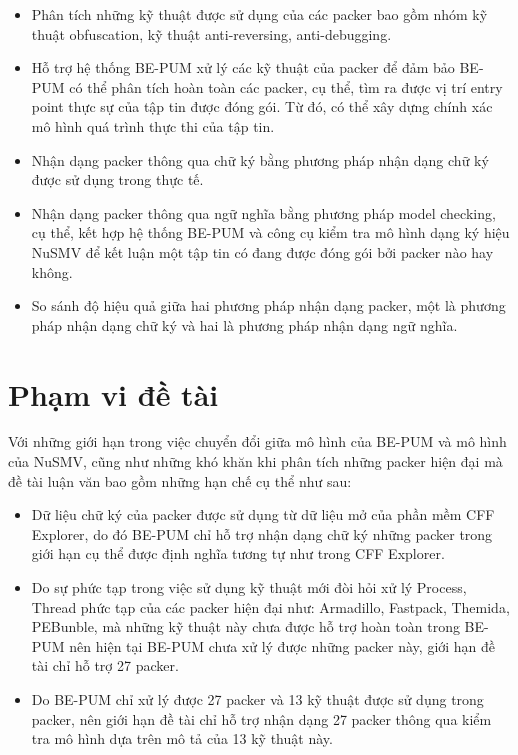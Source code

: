 \begin{itemize}
\item{Phân tích những kỹ thuật được sử dụng của các packer bao gồm nhóm kỹ thuật obfuscation, kỹ thuật anti-reversing, anti-debugging.\\} 
\item{Hỗ trợ hệ thống BE-PUM xử lý các kỹ thuật của packer để đảm bảo BE-PUM có thể phân tích hoàn toàn các packer, cụ thể, tìm ra được vị trí entry point thực sự của tập tin được đóng gói. Từ đó, có thể xây dựng chính xác mô hình quá trình thực thi của tập tin.\\}
\item{Nhận dạng packer thông qua chữ ký bằng phương pháp nhận dạng chữ ký được sử dụng trong thực tế.\\}
\item{Nhận dạng packer thông qua ngữ nghĩa bằng phương pháp model checking, cụ thể, kết hợp hệ thống BE-PUM và công cụ kiểm tra mô hình dạng ký hiệu NuSMV để kết luận một tập tin có đang được đóng gói bởi packer nào hay không.\\}
\item{So sánh độ hiệu quả giữa hai phương pháp nhận dạng packer, một là phương pháp nhận dạng chữ ký và hai là phương pháp nhận dạng ngữ nghĩa.}
\end{itemize}

\section{Phạm vi đề tài}

\hspace{0.5cm}Với những giới hạn trong việc chuyển đổi giữa mô hình của BE-PUM và mô hình của NuSMV, cũng như những khó khăn khi phân tích những packer hiện đại mà đề tài luận văn bao gồm những hạn chế cụ thể như sau:

\begin{itemize}
\item{Dữ liệu chữ ký của packer được sử dụng từ dữ liệu mở của phần mềm CFF Explorer, do đó BE-PUM chỉ hỗ trợ nhận dạng chữ ký những packer trong giới hạn cụ thể được định nghĩa tương tự như trong CFF Explorer.\\}
\item{Do sự phức tạp trong việc sử dụng kỹ thuật mới đòi hỏi xử lý Process, Thread phức tạp của các packer hiện đại như: Armadillo, Fastpack, Themida, PEBunble, mà những kỹ thuật này chưa được hỗ trợ hoàn toàn trong BE-PUM nên hiện tại BE-PUM chưa xử lý được những packer này, giới hạn đề tài chỉ hỗ trợ 27 packer.\\}
\item{Do BE-PUM chỉ xử lý được 27 packer và 13 kỹ thuật được sử dụng trong packer, nên giới hạn đề tài chỉ hỗ trợ nhận dạng 27 packer thông qua kiểm tra mô hình dựa trên mô tả của 13 kỹ thuật này.}
\end{itemize}  


